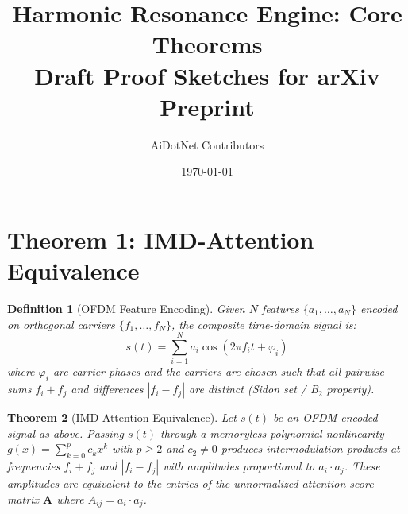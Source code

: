 \documentclass[11pt]{article}
\title{Harmonic Resonance Engine: Core Theorems\\
\large Draft Proof Sketches for arXiv Preprint}
\author{AiDotNet Contributors}
\date{\today}
\newtheorem{theorem}{Theorem}
\newtheorem{definition}[theorem]{Definition}
\begin{document}
\maketitle

\section{Theorem 1: IMD-Attention Equivalence}

\begin{definition}[OFDM Feature Encoding]
Given $N$ features $\{a_1, \ldots, a_N\}$ encoded on orthogonal carriers
$\{f_1, \ldots, f_N\}$, the composite time-domain signal is:
\begin{equation}
s(t) = \sum_{i=1}^{N} a_i \cos(2\pi f_i t + \varphi_i)
\end{equation}
where $\varphi_i$ are carrier phases and the carriers are chosen such that
all pairwise sums $f_i + f_j$ and differences $|f_i - f_j|$ are distinct
(Sidon set / B$_2$ property).
\end{definition}

\begin{theorem}[IMD-Attention Equivalence]
\label{thm:imd-attention}
Let $s(t)$ be an OFDM-encoded signal as above. Passing $s(t)$ through
a memoryless polynomial nonlinearity $g(x) = \sum_{k=0}^{p} c_k x^k$
with $p \geq 2$ and $c_2 \neq 0$ produces intermodulation products at
frequencies $f_i + f_j$ and $|f_i - f_j|$ with amplitudes proportional
to $a_i \cdot a_j$. These amplitudes are equivalent to the entries of
the unnormalized attention score matrix $\mathbf{A}$ where
$A_{ij} = a_i \cdot a_j$.
\end{theorem}
\end{document}
